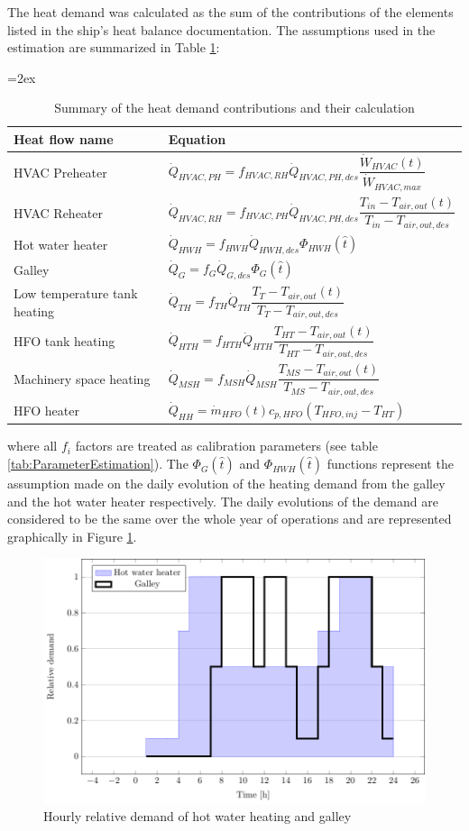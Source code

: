 \documentclass[preprint,12pt]{elsarticle}
\begin{document}
The heat demand was calculated as the sum of the contributions of the elements listed in the ship's heat balance documentation. The assumptions used in the estimation are summarized in Table \ref{tab:HeatDemand}:
\begin{table}
	\centering
	{\tablinesep=2ex\tabcolsep=10pt
		\begin{tabular}{p{2.8cm}l}
			\hline 
			Heat flow name & Equation \\
			\hline
			HVAC Preheater & $\dot{Q}_{HVAC,PH} = f_{HVAC,RH} \dot{Q}_{HVAC,PH,des} \dfrac{\dot{W}_{HVAC}(t)}{\dot{W}_{HVAC,max}} $ \\
			HVAC Reheater &	$\dot{Q}_{HVAC,RH} = f_{HVAC,PH} \dot{Q}_{HVAC,PH,des} \dfrac{T_{in} - T_{air,out}(t)}{T_{in} - T_{air,out,des}}$ \\
			Hot water heater& $\dot{Q}_{HWH} = f_{HWH} \dot{Q}_{HWH,des} \Phi_{HWH}(\hat{t})$ \\
			Galley & $\dot{Q}_{G} = f_{G} \dot{Q}_{G,des} \Phi_G(\hat{t})$ \\
			Low temperature tank heating & $\dot{Q}_{TH} = f_{TH} \dot{Q}_{TH} \dfrac{T_{T} - T_{air,out}(t)}{T_{T} -T_{air,out,des}}$ \\
			HFO tank heating & $\dot{Q}_{HTH} = f_{HTH} \dot{Q}_{HTH} \dfrac{T_{HT} - T_{air,out}(t)}{T_{HT} - T_{air,out,des}}$ \\
			Machinery space heating & $\dot{Q}_{MSH} = f_{MSH} \dot{Q}_{MSH} \dfrac{T_{MS} - T_{air,out}(t)}{T_{MS} - T_{air,out,des}}$ \\
			HFO heater & $\dot{Q}_{HH} = \dot{m}_{HFO}(t) c_{p,HFO} (T_{HFO,inj} - T_{HT})$ \\
			\hline
	\end{tabular}}
	\caption{Summary of the heat demand contributions and their calculation}
	\label{tab:HeatDemand}
\end{table}

where all $f_i$ factors are treated as calibration parameters (see table \ref{tab:ParameterEstimation}). The $\Phi_G(\hat{t})$ and $\Phi_{HWH}(\hat{t})$ functions represent the assumption made on the daily evolution of the heating demand from the galley and the hot water heater respectively. The daily evolutions of the demand are considered to be the same over the whole year of operations and are represented graphically in Figure \ref{fig:galleyhotwater}.

\begin{figure}[tbp!]
	\centering
	\includegraphics[width=0.7\linewidth]{Figures/galleyHotWater.pdf}
	\caption{Hourly relative demand of hot water heating and galley}
	\label{fig:galleyhotwater}
\end{figure}
\end{document}
